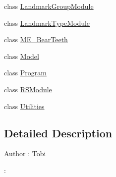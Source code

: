 \begin{DoxyCompactItemize}
\item 
class \hyperlink{class_real_sense_1_1_landmark_group_module}{Landmark\+Group\+Module}
\item 
class \hyperlink{class_real_sense_1_1_landmark_type_module}{Landmark\+Type\+Module}
\item 
class \hyperlink{class_real_sense_1_1_m_e___bear_teeth}{M\+E\+\_\+\+Bear\+Teeth}
\item 
class \hyperlink{class_real_sense_1_1_model}{Model}
\item 
class \hyperlink{class_real_sense_1_1_program}{Program}
\item 
class \hyperlink{class_real_sense_1_1_r_s_module}{R\+S\+Module}
\item 
class \hyperlink{class_real_sense_1_1_utilities}{Utilities}
\end{DoxyCompactItemize}


\subsection{Detailed Description}
\begin{DoxyAuthor}{Author}
\+: Tobi 

\+: 
\end{DoxyAuthor}
